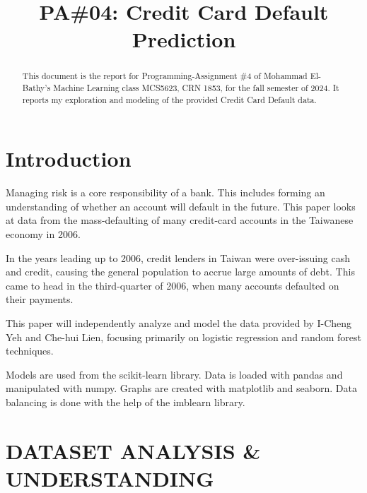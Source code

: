 \documentclass[conference]{IEEEtran}
\begin{document}
\title{PA\#04: Credit Card Default Prediction}

\author{
}

\maketitle

\begin{abstract}
	This document is the report for Programming-Assignment \#4 of Mohammad
	El-Bathy's Machine Learning class MCS5623, CRN 1853, for the fall
	semester of 2024. It reports my exploration and modeling of the
	provided Credit Card Default data.
\end{abstract}

\section{Introduction}

Managing risk is a core responsibility of a bank. This includes forming an
understanding of whether an account will default in the future. This paper
looks at data from the mass-defaulting of many credit-card accounts in the
Taiwanese economy in 2006. \cite{default_of_credit_card_clients_350}

In the years leading up to 2006, credit lenders in Taiwan were over-issuing
cash and credit, causing the general population to accrue large amounts of
debt. This came to head in the third-quarter of 2006, when many accounts
defaulted on their payments. \cite{Yeh2009TheCO}

This paper will independently analyze and model the data provided by I-Cheng
Yeh and Che-hui Lien, focusing primarily on logistic regression and random
forest techniques.

Models are used from the scikit-learn library\cite{scikit-learn}. Data is
loaded with pandas\cite{pandas2020}\cite{pandas2010} and manipulated with
numpy\cite{numpy}. Graphs are created with matplotlib\cite{matplotlib} and
seaborn\cite{seaborn}. Data balancing is done with the help of the
imblearn\cite{imblearn} library.

\FloatBarrier
\section{DATASET ANALYSIS \& UNDERSTANDING}
\end{document}
